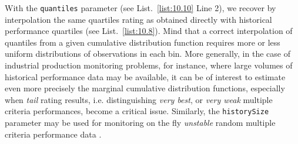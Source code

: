 With the \texttt{quantiles} parameter (see List.~\vref{list:10.10} Line 2), we recover by interpolation the same quartiles rating as obtained directly with historical performance quartiles (see List.~\vref{list:10.8}). Mind that a correct interpolation of quantiles from a given cumulative distribution function requires more or less uniform distributions of observations in each bin. 
More generally, in the case of industrial production monitoring problems, for instance, where large volumes of historical performance data may be available, it can be of interest to estimate even more precisely the marginal cumulative distribution functions, especially when \emph{tail} rating results, i.e. distinguishing \emph{very best}, or \emph{very weak} multiple criteria performances, become a critical issue. Similarly, the \texttt{historySize} parameter may be used for monitoring on the fly \emph{unstable} random multiple criteria performance data \citep{CHAM-2006}.  	

% 



